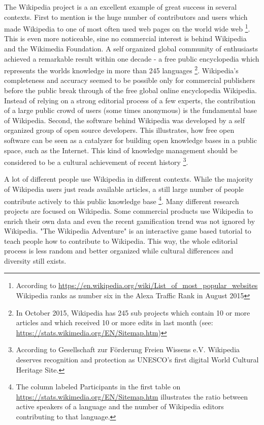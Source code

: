 \documentclass[a4paper,10pt]{scrbook}
\begin{document}
The Wikipedia project is a an excellent example of great success in several contexts. First to mention is the huge number of contributors and users which made Wikipedia to one of most often used web pages on the world wide web \footnote{According to \url{https://en.wikipedia.org/wiki/List_of_most_popular_websites} Wikipedia ranks as number six in the Alexa Traffic Rank in August 2015}. This is even more noticeable, sine no commercial interest is behind Wikipedia and the Wikimedia Foundation. A self organized global community of enthusiasts achieved a remarkable result within one decade - a free public encyclopedia which represents the worlds knowledge in more than 245 languages \footnote{In October 2015, Wikipedia has 245 sub projects which contain 10 or more articles and which received 10 or more edits in last month (see: \url{https://stats.wikimedia.org/EN/Sitemap.htm})}. Wikipedia's completeness and accuracy seemed to be possible only for commercial publishers before the public break through of the free global online encyclopedia Wikipedia. Instead of relying on a strong editorial process of a few experts, the contribution of a large public crowd of users (some times anonymous) is the fundamental base of Wikipedia. Second, the software behind Wikipedia was developed by a self organized group of open source developers. This illustrates, how free open software can be seen as a catalyzer for building open knowledge bases in a public space, such as the Internet. This kind of knowledge management should be considered to be a cultural achievement of recent history \footnote{According to Gesellschaft zur Förderung Freien Wissens e.V. Wikipedia deserves recognition and protection as UNESCO’s first digital World Cultural Heritage Site.}.  

A lot of different people use Wikipedia in different contexts. While the majority of Wikipedia users just reads available articles, a still large number of people contribute actively to this public knowledge base \footnote{The column labeled Participants in the first table on \url{https://stats.wikimedia.org/EN/Sitemap.htm} illustrates the ratio between active speakers of a language and the number of Wikipedia editors contributing to that language.}. Many different research projects are focused on Wikipedia. Some commercial products use Wikipedia to enrich their own data and even the recent gamification trend was not ignored by Wikipedia. "The Wikipedia Adventure" is an interactive game based tutorial to teach people how to contribute to Wikipedia. This way, the whole editorial process is less random and better organized while cultural differences and diversity still exists. 
\end{document}
